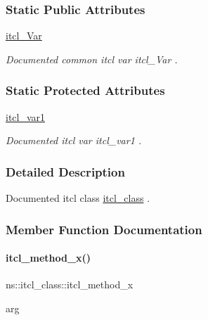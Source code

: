 \subsubsection*{Static Public Attributes}
\begin{DoxyCompactItemize}
\item 
\mbox{\label{classns_1_1itcl__class_a8df46696ce554fed04d170932260fbb8}} 
\mbox{\hyperlink{classns_1_1itcl__class_a8df46696ce554fed04d170932260fbb8}{itcl\+\_\+\+Var}}
\begin{DoxyCompactList}\small\item\em Documented common itcl var {\ttfamily itcl\+\_\+\+Var} . \end{DoxyCompactList}\end{DoxyCompactItemize}
\subsubsection*{Static Protected Attributes}
\begin{DoxyCompactItemize}
\item 
\mbox{\label{classns_1_1itcl__class_ae515e43ca6bb755d116416f94a13d344}} 
\mbox{\hyperlink{classns_1_1itcl__class_ae515e43ca6bb755d116416f94a13d344}{itcl\+\_\+var1}}
\begin{DoxyCompactList}\small\item\em Documented itcl var {\ttfamily itcl\+\_\+var1} . \end{DoxyCompactList}\end{DoxyCompactItemize}


\subsubsection{Detailed Description}
Documented itcl class {\ttfamily \mbox{\hyperlink{classns_1_1itcl__class}{itcl\+\_\+class}}} . 

\subsubsection{Member Function Documentation}
\mbox{\label{classns_1_1itcl__class_abc59160f823f3a6ec8c292c034aedbc3}} 
\paragraph{\texorpdfstring{itcl\_method\_x()}{itcl\_method\_x()}}
{\footnotesize\ttfamily ns\+::itcl\+\_\+class\+::itcl\+\_\+method\+\_\+x\begin{DoxyParamCaption}\item[{}]{arg  }\end{DoxyParamCaption}}



